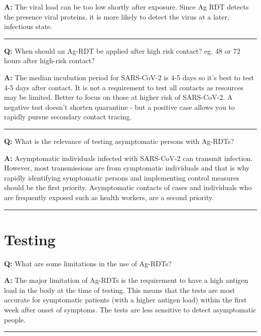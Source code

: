 \documentclass[
]{book}
\begin{document}
\textbf{A:} The viral load can be too low shortly after exposure. Since Ag RDT detects the presence viral proteins, it is more likely to detect the virus at a later, infectious state.

\begin{center}\rule{0.5\linewidth}{0.5pt}\end{center}

\textbf{Q:} When should an Ag-RDT be applied after high risk contact? eg. 48 or 72 hours after high-risk contact?

\textbf{A:} The median incubation period for SARS-CoV-2 is 4-5 days so it's best to test 4-5 days after contact. It is not a requirement to test all contacts as resources may be limited. Better to focus on those at higher risk of SARS-CoV-2. A negative test doesn't shorten quarantine - but a positive case allows you to rapidly pursue secondary contact tracing.

\begin{center}\rule{0.5\linewidth}{0.5pt}\end{center}

\textbf{Q:} What is the relevance of testing asymptomatic persons with Ag-RDTs?

\textbf{A:} Asymptomatic individuals infected with SARS-CoV-2 can transmit infection. However, most transmissions are from symptomatic individuals and that is why rapidly identifying symptomatic persons and implementing control measures should be the first priority. Asymptomatic contacts of cases and individuals who are frequently exposed such as health workers, are a second priority.

\begin{center}\rule{0.5\linewidth}{0.5pt}\end{center}

\hypertarget{testing}{%
\section{Testing}\label{testing}}

\textbf{Q:} What are some limitations in the use of Ag-RDTs?

\textbf{A:} The major limitation of Ag-RDTs is the requirement to have a high antigen load in the body at the time of testing. This means that the tests are most accurate for symptomatic patients (with a higher antigen load) within the first week after onset of symptoms. The tests are less sensitive to detect asymptomatic people.

\begin{center}\rule{0.5\linewidth}{0.5pt}\end{center}
\end{document}
